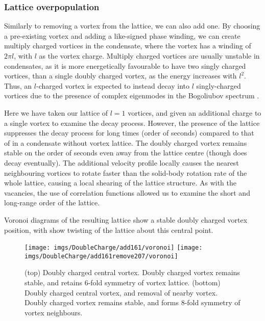 \subsubsection{Lattice overpopulation}
Similarly to removing a vortex from the lattice, we can also add one. By choosing a pre-existing vortex and adding a like-signed phase
winding, we can create multiply charged vortices in the condensate, where the vortex has a winding of $2\pi l$, with $l$ as the vortex
charge. Multiply charged vortices are usually unstable in condensates, as it is more energetically favourable to have two singly charged
vortices, than a single doubly charged vortex, as the energy increases with $l^2$. Thus, an $l$-charged vortex is expected to instead decay
into $l$ singly-charged vortices due to the presence of complex eigenmodes in the Bogoliubov spectrum \cite{VTX:Kawaguchi_pra_2004}.

Here we have taken our lattice of $l=1$ vortices, and given an additional charge to a single vortex to examine the decay process. However,
the presence of the lattice suppresses the decay process for long times (order of seconds) compared to that of in a condensate without vortex
lattice. The doubly charged vortex remains stable on the order of seconds even away from the lattice centre (though does decay eventually).
The additional velocity profile locally causes the nearest neighbouring vortices to rotate faster than the solid-body rotation rate of the
whole lattice, causing a local shearing of the lattice structure. As with the vacancies, the use of correlation functions allowed us to
examine the short and long-range order of the lattice.

Voronoi diagrams of the resulting lattice show a stable doubly charged vortex position, with show twisting of the lattice about this central
point.

\begin{figure}[tb]
	\texttt{[image: imgs/DoubleCharge/add161/voronoi]}
	\texttt{[image: imgs/DoubleCharge/add161remove207/voronoi]}
	\caption{(top) Doubly charged central vortex. Doubly charged vortex remains stable, and retains 6-fold
	symmetry of vortex lattice. (bottom) Doubly charged central vortex, and removal of nearby vortex. Doubly charged vortex remains stable, and forms 8-fold
	symmetry of vortex neighbours.}
	\label{fig:voronoi_double}
\end{figure}



